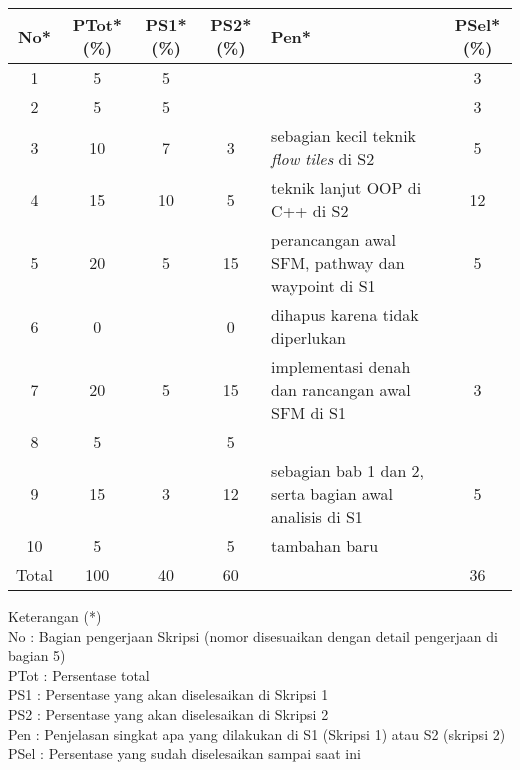 \documentclass[a4paper,twoside]{article}
\begin{document}
\begin{center}
  \begin{tabular}{ | c | c | c | c | l | c |}
    \hline
    No*  & PTot*(\%) & PS1*(\%) & PS2*(\%) &Pen* &PSel*(\%)\\ \hline \hline
    1   & 5  & 5  &  &  & 3 \\ \hline
    2   & 5 & 5  &   &  & 3 \\ \hline
    3   & 10  & 7  & 3 & {\footnotesize sebagian kecil teknik {\it flow tiles} di S2} & 5 \\ \hline
    4   & 15  & 10  &  5 & {\footnotesize teknik lanjut OOP di C++ di S2} & 12 \\ \hline
    5   & 20  & 5  & 15 & {\footnotesize perancangan awal SFM, pathway dan waypoint di S1} & 5 \\ \hline
    6   & 0 &   & 0  &  {\footnotesize dihapus karena tidak diperlukan} & \\\hline
    7   & 20  & 5  & 15 &  {\footnotesize implementasi denah dan rancangan awal SFM di S1} & 3 \\ \hline
    8   & 5  &   &  5  &  &\\ \hline
    9   & 15  & 3  & 12  & {\footnotesize sebagian bab 1 dan 2, serta bagian awal analisis di S1} & 5\\ \hline
    10   & 5  &   & 5  & {\footnotesize tambahan baru} &\\ \hline
    Total  & 100  & 40  & 60 &  & 36\\ \hline
                          \end{tabular}
\end{center}

Keterangan (*)\\
No : Bagian pengerjaan Skripsi (nomor disesuaikan dengan detail pengerjaan di bagian 5)\\
PTot : Persentase total \\
PS1 : Persentase yang akan diselesaikan di Skripsi 1 \\
PS2 : Persentase yang akan diselesaikan di Skripsi 2 \\
Pen : Penjelasan singkat apa yang dilakukan di S1 (Skripsi 1) atau S2 (skripsi 2)\\
PSel : Persentase yang sudah diselesaikan sampai saat ini 
\end{document}

